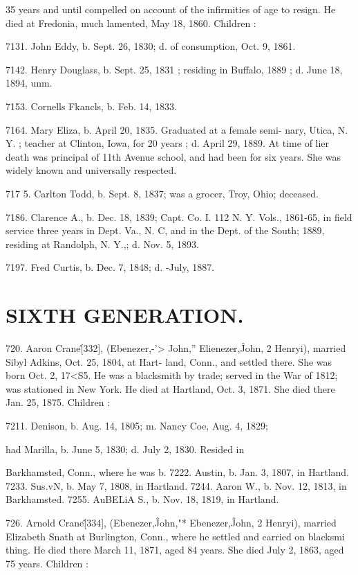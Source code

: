 35 years and until compelled on account of the infirmities of age 
to resign. He died at Fredonia, much lamented, May 18, 1860. 
Children : 

7131. John Eddy, b. Sept. 26, 1830; d. of consumption, Oct. 9, 
1861. 

7142. Henry Douglass, b. Sept. 25, 1831 ; residing in Buffalo, 1889 ; 
d. June 18, 1894, unm. 

7153. Cornells Fkancls, b. Feb. 14, 1833. 

7164. Mary Eliza, b. April 20, 1835. Graduated at a female semi- 
nary, Utica, N. Y. ; teacher at Clinton, Iowa, for 20 years ; 
d. April 29, 1889. At time of lier death was principal of 
11th Avenue school, and had been for six years. She was 
widely known and universally respected. 

717  5. Carlton Todd, b. Sept. 8, 1837; was a grocer, Troy, Ohio; 
deceased. 

7186. Clarence A., b. Dec. 18, 1839; Capt. Co. I. 112 N. Y. Vols., 
1861-65, in field service three years in Dept. Va., N. C, 
and in the Dept. of the South; 1889, residing at Randolph, 
N. Y.,; d. Nov. 5, 1893. 

7197. Fred Curtis, b. Dec. 7, 1848; d. -July, 1887. 



\section{SIXTH GENERATION.}


720. Aaron Crane\^ [332], (Ebenezer,-'> John,'' Elienezer,\^ 
John, 2 Henryi), married Sibyl Adkins, Oct. 25, 1804, at Hart- 
land, Conn., and settled there. She was born Oct. 2, 17<S5. He 
was a blacksmith by trade; served in the War of 1812; was 
stationed in New York. He died at Hartland, Oct. 3, 1871. 
She died there Jan. 25, 1875. Children : 

7211. Denison, b. Aug. 14, 1805; m. Nancy Coe, Aug. 4, 1829; 

had Marilla, b. June 5, 1830; d. July 2, 1830. Resided in 

Barkhamsted, Conn., where he was b. 
7222. Austin, b. Jan. 3, 1807, in Hartland. 
7233. Sus.vN, b. May 7, 1808, in Hartland. 
7244. Aaron W., b. Nov. 12, 1813, in Barkhamsted. 
7255. AuBELiA S., b. Nov. 18, 1819, in Hartland. 

726. Arnold Crane\^ [334], (Ebenezer,\^ John,"* Ebenezer,\^ 
John, 2 Henryi), married Elizabeth Snath at Burlington, Conn., 
where he settled and carried on blacksmi thing. He died there 
March 11, 1871, aged 84 years. She died July 2, 1863, aged 75 
years. Children : 

